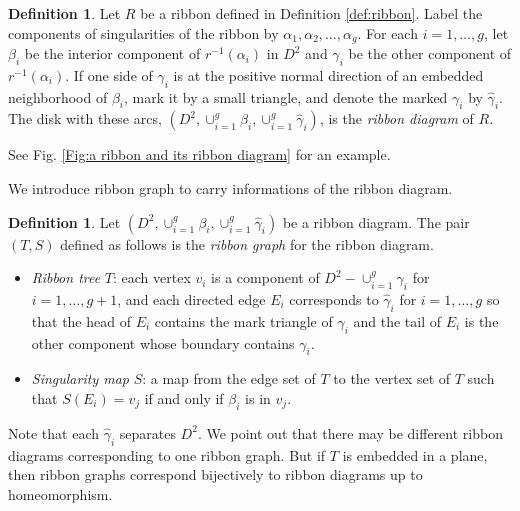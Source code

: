 \documentclass{amsart}
\theoremstyle{definition}
\newtheorem{defn}[thm]{Definition}
\theoremstyle{remark}
\numberwithin{equation}{subsection}
\begin{document}
\begin{defn}\label{def:rd}
    Let $R$ be a ribbon defined in Definition \ref{def:ribbon}. Label the components of singularities of the ribbon by $\alpha_1, \alpha_2, \dots, \alpha_g$. For each $i = 1, \dots, g$, let $\beta_i$ be the interior component of $r^{-1}(\alpha_i)$ in $D^2$ and $\gamma_i$ be the other component of $r^{-1}(\alpha_i)$. If one side of $\gamma_i$ is at the positive normal direction of an embedded neighborhood of $\beta_i$, mark it by a small triangle, and denote the marked $\gamma_i$ by $\hat{\gamma}_i$. The disk with these arcs, $(D^2, \cup_{i=1}^g \beta_i, \cup_{i=1}^g \hat{\gamma}_i)$, is the \textit{ribbon diagram} of $R$.
\end{defn}
See Fig. \ref{Fig:a ribbon and its ribbon diagram} for an example.

We introduce ribbon graph to carry informations of the ribbon diagram.
\begin{defn}\label{def:rg}
Let $(D^2, \cup_{i=1}^g \beta_i, \cup_{i=1}^g \hat{\gamma}_i)$ be a ribbon diagram. The pair $(T, S)$ defined as follows is the \textit{ribbon graph} for the ribbon diagram.

\begin{itemize}
\item \textit{Ribbon tree} $T$: each vertex $v_i$ is a component of $D^2 - \cup_{i=1}^g \gamma_i$ for $i = 1, \dots, g + 1$, and each directed edge $E_i$ corresponds to $\hat{\gamma}_i$ for $i = 1, \dots, g$ so that the head of $E_i$ contains the mark triangle of $\hat{\gamma}_i$ and the tail of $E_i$ is the other component whose boundary contains $\gamma_i$.

\item \textit{Singularity map} $S$: a map from the edge set of $T$ to the vertex set of $T$ such that $S(E_i) = v_j$ if and only if $\beta_i$ is in $v_j$.
\end{itemize}
\end{defn}

Note that each $\hat{\gamma}_i$ separates $D^2$. We point out that there may be different ribbon diagrams corresponding to one ribbon graph. But if $T$ is embedded in a plane, then ribbon graphs correspond bijectively to ribbon diagrams up to homeomorphism.
\end{document}
